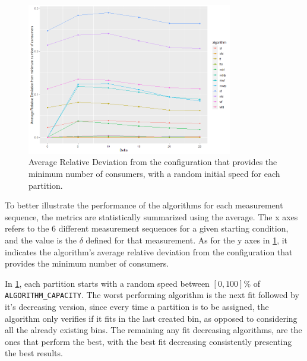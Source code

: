 \begin{figure}[H]
    \centering
    \includegraphics[width=0.8\textwidth]{images/controller/Relative Number of Consumers.png}
\caption{Average Relative Deviation from the configuration that provides the minimum number of consumers, with a random initial speed for each partition.}
\label{fig:relative_nconsumers}
\end{figure}

To better illustrate the performance of the algorithms for each measurement sequence, the metrics are statistically summarized using the average. The x axes refers to the 6 different measurement sequences for a given starting condition, and the value is the $\delta$ defined for that measurement. As for the y axes in \ref{fig:relative_nconsumers}, it indicates the algorithm's average relative deviation from the configuration that provides the minimum number of consumers.

In \ref{fig:relative_nconsumers}, each partition starts with a random speed between $[0,100]\%$ of \lstinline[language=Python]{ALGORITHM_CAPACITY}. The worst performing algorithm is the next fit followed by it's decreasing version, since every time a partition is to be assigned, the algorithm only verifies if it fits in the last created bin, as opposed to considering all the already existing bins. The remaining any fit decreasing algorithms, are the ones that perform the best, with the best fit decreasing consistently presenting the best results. 

